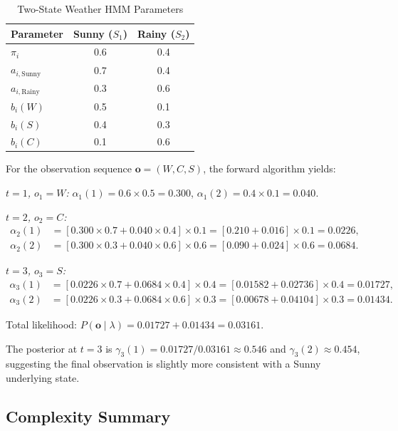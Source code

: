 \documentclass[conference]{IEEEtran}
\begin{document}
\begin{table}[h]
\centering
\caption{Two-State Weather HMM Parameters}
\label{tab:weather_params}
\begin{tabular}{lcc}
\toprule
\textbf{Parameter} & \textbf{Sunny ($S_1$)} & \textbf{Rainy ($S_2$)} \\
\midrule
$\pi_i$ & 0.6 & 0.4 \\
$a_{i,\text{Sunny}}$ & 0.7 & 0.4 \\
$a_{i,\text{Rainy}}$ & 0.3 & 0.6 \\
$b_i(W)$ & 0.5 & 0.1 \\
$b_i(S)$ & 0.4 & 0.3 \\
$b_i(C)$ & 0.1 & 0.6 \\
\bottomrule
\end{tabular}
\end{table}

For the observation sequence $\mathbf{o} = (W, C, S)$, the forward algorithm yields:

\textit{$t=1$, $o_1 = W$:}
$\alpha_1(1) = 0.6 \times 0.5 = 0.300$, $\alpha_1(2) = 0.4 \times 0.1 = 0.040$.

\textit{$t=2$, $o_2 = C$:}
\begin{align*}
\alpha_2(1) &= [0.300 \times 0.7 + 0.040 \times 0.4] \times 0.1 = [0.210 + 0.016] \times 0.1 = 0.0226, \\
\alpha_2(2) &= [0.300 \times 0.3 + 0.040 \times 0.6] \times 0.6 = [0.090 + 0.024] \times 0.6 = 0.0684.
\end{align*}

\textit{$t=3$, $o_3 = S$:}
\begin{align*}
\alpha_3(1) &= [0.0226 \times 0.7 + 0.0684 \times 0.4] \times 0.4 = [0.01582 + 0.02736] \times 0.4 = 0.01727, \\
\alpha_3(2) &= [0.0226 \times 0.3 + 0.0684 \times 0.6] \times 0.3 = [0.00678 + 0.04104] \times 0.3 = 0.01434.
\end{align*}

Total likelihood: $P(\mathbf{o} \mid \lambda) = 0.01727 + 0.01434 = 0.03161$.

The posterior at $t=3$ is $\gamma_3(1) = 0.01727 / 0.03161 \approx 0.546$ and $\gamma_3(2) \approx 0.454$, suggesting the final observation is slightly more consistent with a Sunny underlying state.

\subsection{Complexity Summary}
\end{document}
